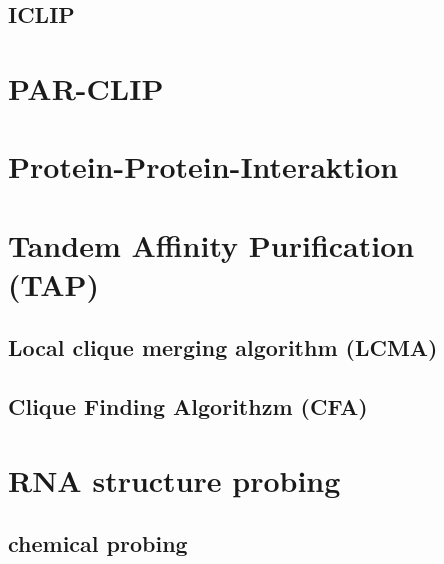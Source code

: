 \documentclass[12pt,a4paper]{article}
\begin{document}
\subsection{ICLIP}

\section{PAR-CLIP}

\section{Protein-Protein-Interaktion}

\section{Tandem Affinity Purification (TAP)}

\subsection{Local clique merging algorithm (LCMA)}

\subsection{Clique Finding Algorithzm (CFA)}

\section{RNA structure probing}

\subsection{chemical probing}



\newpage



\newpage



\newpage



\newpage


\end{document}
